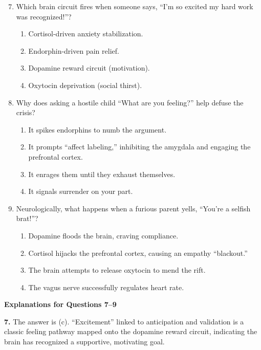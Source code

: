 \begin{practiceexercise}
\begin{enumerate}
    \setcounter{enumi}{6}
    \item Which brain circuit fires when someone says, ``I'm so excited my hard work was recognized!''?
    \begin{enumerate}
        \item Cortisol-driven anxiety stabilization.
        \item Endorphin-driven pain relief.
        \item Dopamine reward circuit (motivation).
        \item Oxytocin deprivation (social thirst).
    \end{enumerate}
    \vspace{\fill}
    \item Why does asking a hostile child ``What are you feeling?'' help defuse the crisis?
    \begin{enumerate}
        \item It spikes endorphins to numb the argument.
        \item It prompts ``affect labeling,'' inhibiting the amygdala and engaging the prefrontal cortex.
        \item It enrages them until they exhaust themselves.
        \item It signals surrender on your part.
    \end{enumerate}
    \vspace{\fill}
    \item Neurologically, what happens when a furious parent yells, ``You're a selfish brat!''?
    \begin{enumerate}
        \item Dopamine floods the brain, craving compliance.
        \item Cortisol hijacks the prefrontal cortex, causing an empathy ``blackout.''
        \item The brain attempts to release oxytocin to mend the rift.
        \item The vagus nerve successfully regulates heart rate.
    \end{enumerate}
\end{enumerate}
\vspace{\fill}
\newpage

\textbf{Explanations for Questions 7--9}

\textbf{7.} The answer is (c). ``Excitement'' linked to anticipation and validation is a classic feeling pathway mapped onto the dopamine reward circuit, indicating the brain has recognized a supportive, motivating goal.


\end{practiceexercise}
